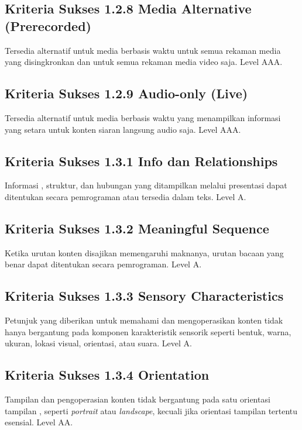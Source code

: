 \subsection{Kriteria Sukses 1.2.8 Media Alternative (Prerecorded)}
\label{sec:kriteria_1.2.8}
Tersedia alternatif untuk media berbasis waktu untuk semua rekaman media yang disingkronkan dan untuk semua rekaman media video saja.
Level AAA.

\subsection{Kriteria Sukses 1.2.9 Audio-only (Live)}
\label{sec:kriteria_1.2.9}
Tersedia alternatif untuk media berbasis waktu yang menampilkan informasi yang setara untuk konten siaran langsung audio saja.
Level AAA.

\subsection{Kriteria Sukses 1.3.1 Info dan Relationships}
\label{sec:kriteria_1.3.1}
Informasi , struktur, dan hubungan yang ditampilkan melalui presentasi dapat ditentukan secara pemrograman atau tersedia dalam teks.
Level A.

\subsection{Kriteria Sukses 1.3.2 Meaningful Sequence}
\label{sec:kriteria_1.3.2}
Ketika urutan konten disajikan memengaruhi maknanya, urutan bacaan yang benar dapat ditentukan secara pemrograman.
Level A.

\subsection{Kriteria Sukses 1.3.3 Sensory Characteristics}
\label{sec:kriteria_1.3.3}
Petunjuk yang diberikan untuk memahami dan mengoperasikan konten tidak hanya bergantung pada komponen karakteristik sensorik seperti bentuk, warna, ukuran, lokasi visual, orientasi, atau suara.
Level A.

\subsection{Kriteria Sukses 1.3.4 Orientation}
\label{sec:kriteria_1.3.4}
Tampilan dan pengoperasian konten tidak bergantung pada satu orientasi tampilan , seperti \textit{portrait} atau \textit{landscape}, kecuali jika orientasi tampilan tertentu esensial.
Level AA.

